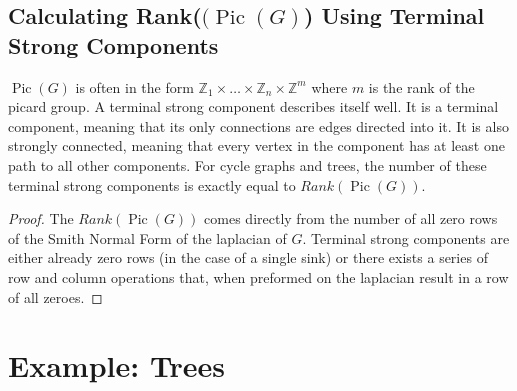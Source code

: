\documentclass[11pt,reqno]{amsart}
\DeclareMathOperator{\Pic}{Pic}
\theoremstyle{definition}
\theoremstyle{plain}
\begin{document}


	\subsection{Calculating Rank($(\Pic(G)$) Using Terminal Strong Components}
		$\Pic(G)$ is often in the form $\mathbb{Z}_1 \times \dots \times \mathbb{Z}_n \times \mathbb{Z}^m$ where $m$ is
		the rank of the picard group.  A terminal strong component describes itself well.  It is a terminal component,
		meaning that its only connections are edges directed into it.  It is also strongly connected, meaning that every
		vertex in the component has at least one path to all other components.  For cycle graphs and trees, the number
		of these terminal strong components is exactly equal to $Rank(\Pic(G))$.

		\begin{proof}
			The $Rank(\Pic(G))$ comes directly from the number of all zero rows of the Smith Normal Form of the laplacian of
			$G$.  Terminal strong components are either already zero rows (in the case of a single sink) or there
			exists a series of row and column operations that, when preformed on the laplacian result in a row of all
			zeroes.
		\end{proof}

\section{Example: Trees}
\end{document}
